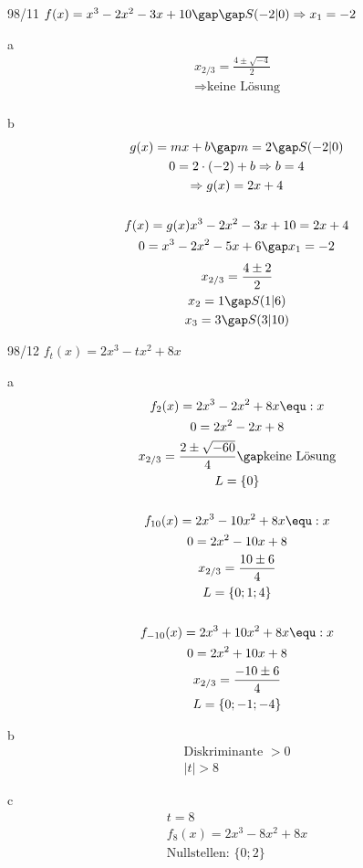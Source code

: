 \begin{exercise}{98/11}
  $f(x) = x^3 - 2x^2 - 3x + 10 \gap\gap S(-2|0) \Rightarrow x_1 = -2$
  \item [a]
  \begin{gather*}
    x_{2/3} = \frac{4 \pm \sqrt{-4}}{2} \\
    \Rightarrow \text{keine Lösung} \\
  \end{gather*}
  \item [b]
  \begin{gather*}
    g(x) = mx + b \gap m = 2 \gap S(-2|0) \\
    0 = 2 \cdot (-2) + b \Rightarrow b = 4 \\
    \Rightarrow g(x) = 2x + 4 \\\\
    f(x) = g(x)
    x^3 - 2x^2 - 3x + 10 = 2x + 4 \\
    0 = x^3 - 2x^2 - 5x + 6 \gap x_1 = -2
  \end{gather*}
  \begin{gather*}
    x_{2/3} = \frac{4 \pm 2}{2} \\
    x_2 = 1 \gap S(1|6) \\
    x_3 = 3 \gap S(3|10)
  \end{gather*}
\end{exercise}
\begin{exercise}{98/12}
  $f_t(x) = 2x^3 - tx^2 + 8x$
  \item [a]
  \begin{gather*}
    f_2(x) = 2x^3 - 2x^2 + 8x \equ :x \\
    0 = 2x^2 - 2x + 8 \\
    x_{2/3} = \frac{2 \pm \sqrt{-60}}{4} \gap \text{keine Lösung} \\
    L = \{0\} \\\\
    f_{10}(x) = 2x^3 - 10x^2 + 8x \equ :x \\
    0 = 2x^2 - 10x + 8 \\
    x_{2/3} = \frac{10 \pm 6}{4} \\
    L = \{0; 1; 4\} \\\\
    f_{-10}(x) = 2x^3 + 10x^2 + 8x \equ :x \\
    0 = 2x^2 + 10x + 8 \\
    x_{2/3} = \frac{-10 \pm 6}{4} \\
    L = \{0; -1; -4\}
  \end{gather*}
  \item [b]
  \begin{gather*}
    \text{Diskriminante } > 0 \\
    |t| > 8
  \end{gather*}
  \item [c]
  \begin{gather*}
    t = 8 \\
    f_8(x) = 2x^3 - 8x^2 + 8x \\
    \text{Nullstellen: } \{0; 2\}
  \end{gather*}
\end{exercise}

